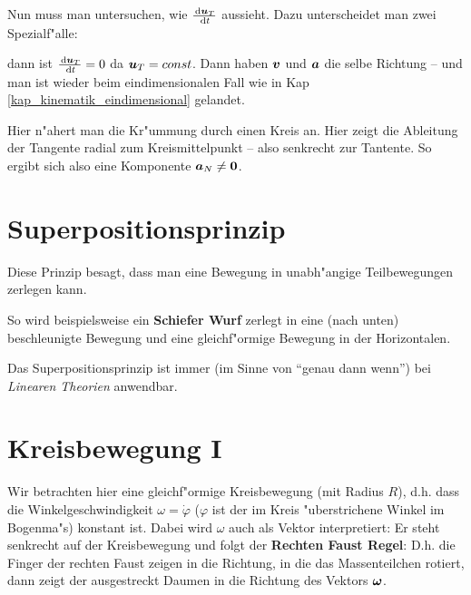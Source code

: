 Nun muss man untersuchen, wie $\frac{\, \mathrm{d} \boldsymbol{u}_T}{\, \mathrm{d} t}$ aussieht. 
Dazu unterscheidet man zwei Spezialf"alle:

\begin{description}[\setlabelstyle{\bfseries\slshape}]
\item[Geradlinige Bahn] dann ist $\frac{\, \mathrm{d} \boldsymbol{u}_T}{\, \mathrm{d} t} = 0$
   da $\boldsymbol{u}_T = const$. Dann haben $\boldsymbol{v}$ und $\boldsymbol{a}$ die selbe
   Richtung -- und man ist wieder beim eindimensionalen Fall wie in
   Kap \ref{kap_kinematik_eindimensional} gelandet.
\item[Gekr"ummte Bahn] Hier n"ahert man die Kr"ummung durch einen Kreis
   an. Hier zeigt die Ableitung der Tangente radial zum
   Kreismittelpunkt -- also senkrecht zur Tantente. So ergibt sich
   also eine Komponente $\boldsymbol{a}_N \neq \boldsymbol{0}$.
\end{description}








\section{Superpositionsprinzip}


\begin{Def}[Superpositionsprinzip]
   Diese Prinzip besagt, dass man eine Bewegung in unabh"angige
   Teilbewegungen zerlegen kann.
\end{Def}

So wird beispielsweise ein \textbf{Schiefer Wurf} zerlegt in eine
(nach unten) beschleunigte Bewegung und eine gleichf"ormige Bewegung in
der Horizontalen.

Das Superpositionsprinzip ist immer (im Sinne von "`genau dann wenn"')
bei \emph{Linearen Theorien} anwendbar.




\section{Kreisbewegung I}
\label{kap_kreisbewegung-i}

Wir betrachten hier eine gleichf"ormige Kreisbewegung (mit Radius $R$),
d.h. dass die Winkelgeschwindigkeit $\omega = \dot \varphi$ ($\varphi$
ist der im Kreis "uberstrichene Winkel im Bogenma"s) konstant ist. Dabei
wird $\omega$ auch als Vektor interpretiert: Er steht senkrecht auf
der Kreisbewegung und folgt der \textbf{Rechten Faust Regel}: D.h. 
die Finger der rechten Faust zeigen in die Richtung, in die das
Massenteilchen rotiert, dann zeigt der ausgestreckt Daumen in die
Richtung des Vektors $\boldsymbol{\omega}$.

